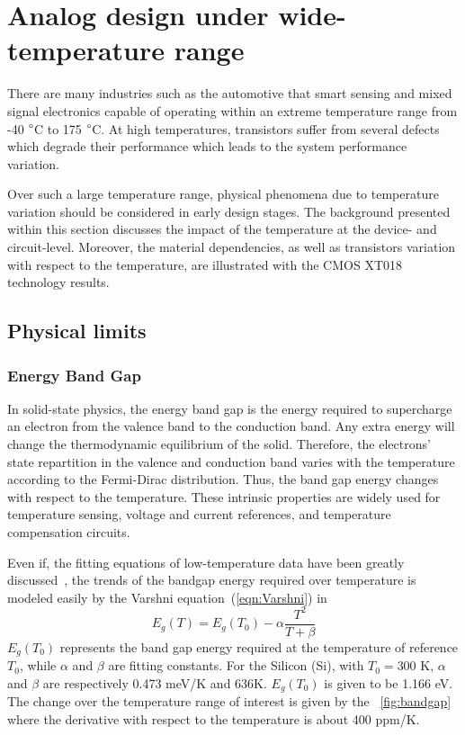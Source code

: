 \section{Analog design under wide-temperature range}
\label{sec:temperature-analogue}

There are many industries such as the automotive that smart sensing and mixed signal electronics capable of operating within an extreme temperature range from -40 \(\degree \)C to 175 \(\degree \)C. At high temperatures, transistors suffer from several defects which degrade their performance which leads to the system performance variation.

Over such a large temperature range, physical phenomena due to temperature variation should be considered in early design stages. The background presented within this section discusses the impact of the temperature at the device- and circuit-level. Moreover, the material dependencies, as well as transistors variation with respect to the temperature, are illustrated with the CMOS XT018 technology results. %

\subsection{Physical limits}


\subsubsection{Energy Band Gap}        %
\label{sec:bandgap}
In solid-state physics, the energy band gap is the energy required to supercharge an electron from the valence band to the conduction band. Any extra energy will change the thermodynamic equilibrium of the solid. Therefore, the electrons' state repartition in the valence and conduction band varies with the temperature according to the Fermi-Dirac distribution. Thus, the band gap energy changes with respect to the temperature. These intrinsic properties are widely used for temperature sensing, voltage and current references, and temperature compensation circuits.

Even if, the fitting equations of low-temperature data have been greatly discussed~\cite{Varshni1967,Allen1976,Manoogian1979,Donnell1991}, the trends of the bandgap energy required over temperature is modeled easily by the Varshni equation~(\ref{eqn:Varshni}) in~\cite{Varshni1967}
\begin{equation}
\label{eqn:Varshni}
E_g(T) = E_g(T_0) - \alpha \frac{T^2}{T+\beta}
\end{equation}
\(E_g(T_0) \) represents the band gap energy required at the temperature of reference \(T_0 \), while \(\alpha \) and \(\beta \) are fitting constants. For the Silicon (Si), with \(T_0 = \)300 K, \(\alpha \) and \(\beta \) are respectively 0.473 meV/K and 636K. \(E_g(T_0) \) is given to be 1.166 eV. The change over the temperature range of interest is given by the \figurename~\ref{fig:bandgap} where the derivative with respect to the temperature is about 400 ppm/K.

